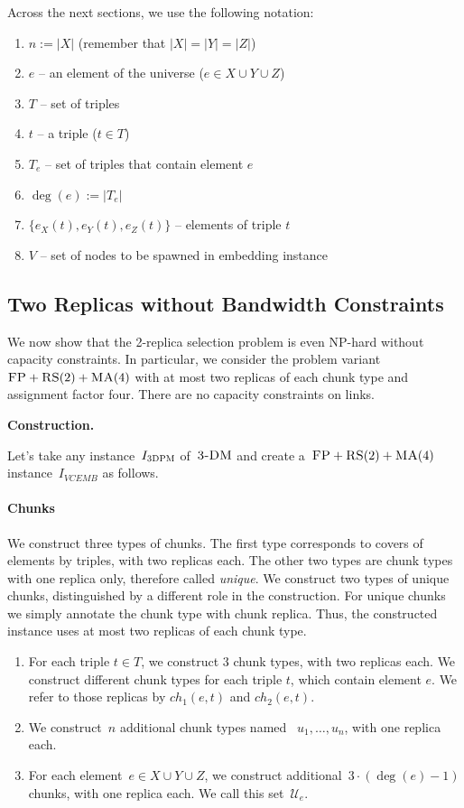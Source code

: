 \documentclass[preprint,12pt]{elsarticle}
\newcommand{\FP}{\textsc{FP}}
\newcommand{\RS}{\textsc{RS}}
\newcommand{\MA}{\textsc{MA}}
\newcommand{\TDPM}{\textsc{3DPM}}
\newcommand{\UniqueE}{{\ensuremath{\mathcal{U}_e}}}
\newcommand{\VCEMB}{VCEMB}
\newcommand{\TDM}{\textsc{3-DM}}
\begin{document}
Across the next sections, we use the following notation:

\begin{enumerate}
  \item $n := |X|$ (remember that $|X| = |Y| = |Z|$)
  \item $e$ -- an element of the universe ($e \in X \cup Y \cup Z$)
  \item $T$ -- set of triples
  \item $t$ -- a triple ($t \in T$)
  \item $T_e$ -- set of triples that contain element $e$
  \item $\deg(e) := |T_e|$
  \item $\lbrace e_X(t), e_Y(t), e_Z(t) \rbrace$ -- elements of triple $t$
  \item $V$ -- set of nodes to be spawned in embedding instance
\end{enumerate}

\subsection{Two Replicas without Bandwidth Constraints}

We now show that the 2-replica selection problem is even NP-hard
without capacity constraints.  In particular, we consider the problem
variant~$\FP+\RS(2)+\MA(4)$ with at most two replicas of each chunk type and assignment factor
four. There are no capacity constraints on links.

\textbf{Construction.}

Let's take any instance~$I_{\TDPM}$ of~$\TDM$ and create a~$\FP+\RS(2)+\MA(4)$
instance~$I_{\VCEMB}$ as follows.

\paragraph{Chunks}

We construct three types of chunks. The first type corresponds to covers of elements by triples, with two replicas each. The other two types are chunk types with one replica only, therefore called \emph{unique}. We construct two types of unique chunks, distinguished by a different role in the construction. For unique chunks we simply annotate the chunk type with chunk replica.
Thus, the constructed instance uses at most two replicas of each chunk type.

\begin{enumerate}
  \item For each triple $t\in T$, we construct $3$ chunk types, with two replicas each. We construct different chunk types for each triple $t$, which 
  contain element $e$. We refer to those replicas by $ch_1(e, t)$ and $ch_2(e, t)$.
  \item We construct~$n$ additional chunk types named
  ~$u_1, \ldots, u_n$, with one replica each.
  \item For each element~$e\in X\cup Y\cup Z$,
  we construct additional~$3\cdot(\deg(e) - 1)$ chunks, with one replica each.
  We call this set~$\UniqueE$.
\end{enumerate}
\end{document}
